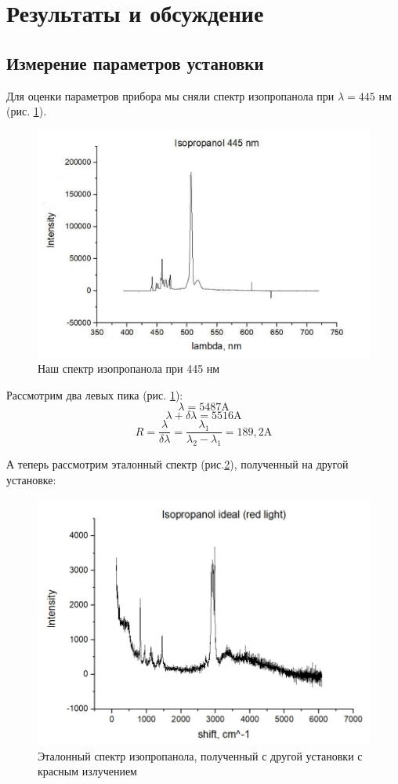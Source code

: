 \documentclass{article}
\begin{document}
\section{Результаты и обсуждение}\;
\subsection{Измерение параметров установки}
\par Для оценки параметров прибора мы сняли спектр изопропанола при $\lambda = 445$ нм (рис. \ref{fig:наш}). 
\begin{figure}[h!]
\centering
    \includegraphics[width=0.8\linewidth]{Images/iso 445.png}
    \caption{Наш спектр изопропанола при 445 нм}
    \label{fig:наш}
\end{figure}
\par Рассмотрим два левых пика (рис. \ref{fig:наш}):
$$\lambda = 5487 \text{A}$$
$$\lambda + \delta \lambda = 5516 \text{A}$$
$$R = \frac{\lambda}{\delta \lambda} = \frac{\lambda _1}{\lambda _2 - \lambda _1} = 189,2 \text{A}$$
\par А теперь рассмотрим эталонный спектр (рис.\ref{red}), полученный на другой установке:
\begin{figure}[h!]
\centering
    \includegraphics[width=0.8\linewidth]{Images/iso.jpg}
    \caption{Эталонный спектр изопропанола, полученный с другой установки с красным излучением}
    \label{red}
\end{figure}
\end{document}
